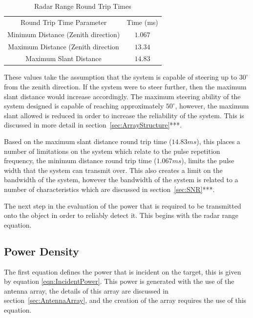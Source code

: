 \documentclass[11pt]{witseiepaper}
\begin{document}
\begin{table}
    \begin{center}
        \begin{tabular}{ c c }
            \hline 
            Round Trip Time Parameter & Time (ms) \\
            Minimum Distance (Zenith direction) & $1.067$ \\
            Maximum Distance  (Zenith direction & $13.34$ \\
            Maximum Slant Distance & $14.83$ \\
        \end{tabular}
        \caption{Radar Range Round Trip Times}
        \label{tab:RadarRangeValues}
    \end{center}
\end{table}
These values take the assumption that the system is capable of steering up to $30^{\circ}$ from the zenith direction. If the system were to steer further, then the maximum slant distance would increase accordingly. The maximum steering ability of the system designed is capable of reaching approximately $50^{\circ}$, however, the maximum slant allowed is reduced in order to increase the reliability of the system. This is discussed in more detail in section~\ref{sec:ArrayStructure}***.

Based on the maximum slant distance round trip time ($14.83 ms$), this places a number of limitations on the system which relate to the pulse repetition frequency, the minimum distance round trip time ($1.067 ms$), limits the pulse width that the system can transmit over. This also creates a limit on the bandwidth of the system, however the bandwidth of the system is related to a number of characteristics which are discussed in section~\ref{sec:SNR}***.


The next step in the evaluation of the power that is required to be transmitted onto the object in order to reliably detect it. This begins with the radar range equation.

\subsection{Power Density} \label{sec:PowerDensity}

The first equation defines the power that is incident on the target, this is given by equation \ref{eqn:IncidentPower}. This power is generated with the use of the antenna array, the details of this array are discussed in section~\ref{sec:AntennaArray}, and the creation of the array requires the use of this equation. 
\end{document}
